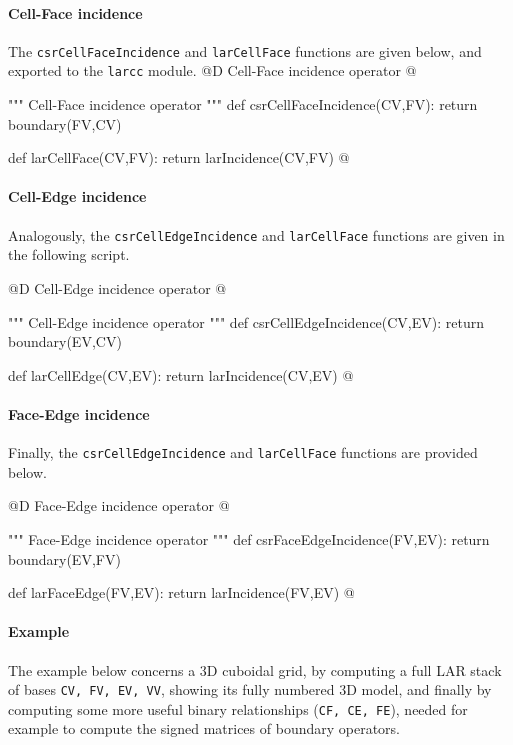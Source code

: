 \documentclass[11pt,oneside]{article}	%
\begin{document}
\paragraph{Cell-Face incidence}
The \texttt{csrCellFaceIncidence} and \texttt{larCellFace} functions are given below, and exported to the \texttt{larcc} module.
@D Cell-Face incidence operator
@{""" Cell-Face incidence operator """
def csrCellFaceIncidence(CV,FV):
	return boundary(FV,CV)

def larCellFace(CV,FV):
	return larIncidence(CV,FV)
@}

\paragraph{Cell-Edge incidence}
Analogously, the \texttt{csrCellEdgeIncidence} and \texttt{larCellFace} functions are given in the following script.

@D Cell-Edge incidence operator
@{""" Cell-Edge incidence operator """
def csrCellEdgeIncidence(CV,EV):
	 return boundary(EV,CV)

def larCellEdge(CV,EV):
	return larIncidence(CV,EV)
@}

\paragraph{Face-Edge incidence}
Finally, the \texttt{csrCellEdgeIncidence} and \texttt{larCellFace} functions are provided below.

@D Face-Edge incidence operator
@{""" Face-Edge incidence operator """
def csrFaceEdgeIncidence(FV,EV):
	return boundary(EV,FV)

def larFaceEdge(FV,EV):
	return larIncidence(FV,EV)
@}


\paragraph{Example}
The example below concerns a 3D cuboidal grid, by computing a full LAR stack of bases
\texttt{CV, FV, EV, VV}, showing its fully numbered 3D model, and finally by computing
some more useful binary relationships (\texttt{CF, CE, FE}), needed for example to compute the signed matrices of boundary operators.
\end{document}
